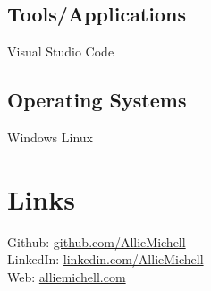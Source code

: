 \documentclass[letterpaper]{deedy-resume} %
\begin{document}
\begin{minipage}[t]{0.33\textwidth}
\subsection{Tools/Applications}
Visual Studio Code 
\sectionspace
\subsection{Operating Systems}
Windows \textbullet{} Linux 

\sectionspace %

\section{Links} 

Github: \href{https://github.com/AllieMichell}{github.com/AllieMichell} \\ 
LinkedIn: \href{https://www.linkedin.com/in/allie-michell-flores-sanchez-91282614a/}{linkedin.com/AllieMichell} \\
Web: \href{https://www.alliemichell.com}{alliemichell.com} \\


\sectionspace %


\end{minipage} %
\hfill
%
%
\end{document}

